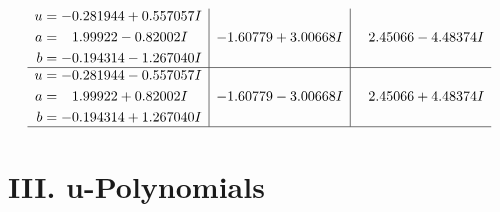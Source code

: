 \documentclass[1p]{elsarticle_modified}
\theoremstyle{definition}
\begin{document}
$$\begin{array}{c|c|c}
\begin{aligned}
u &= -0.281944 + 0.557057 I \\
a &= \phantom{-}1.99922 - 0.82002 I \\
b &= -0.194314 - 1.267040 I\end{aligned}
 & -1.60779 + 3.00668 I & \phantom{-}2.45066 - 4.48374 I \\ \hline\begin{aligned}
u &= -0.281944 - 0.557057 I \\
a &= \phantom{-}1.99922 + 0.82002 I \\
b &= -0.194314 + 1.267040 I\end{aligned}
 & -1.60779 - 3.00668 I & \phantom{-}2.45066 + 4.48374 I\\
 \hline 
 \end{array}$$\newpage
\newpage\renewcommand{\arraystretch}{1}
\centering \section*{ III. u-Polynomials}
\end{document}
